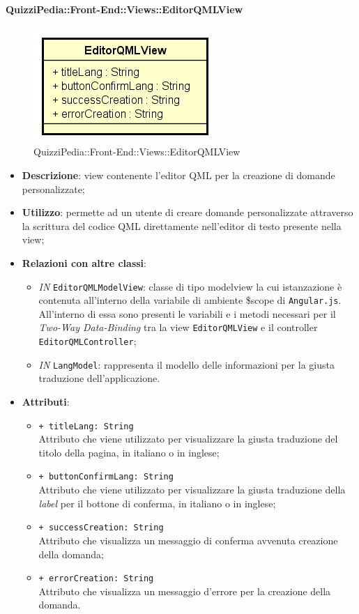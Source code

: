 \paragraph{QuizziPedia::Front-End::Views::EditorQMLView}
\begin{figure} [ht]
	\centering
	\includegraphics[scale=0.45]{UML/Classi/Front-End/QuizziPedia_Front-end_EditorQMLView.png}
	\caption{QuizziPedia::Front-End::Views::EditorQMLView}
\end{figure} \FloatBarrier
\begin{itemize}
	\item \textbf{Descrizione}: view contenente l'editor QML per la creazione di domande personalizzate;
	\item \textbf{Utilizzo}: permette ad un utente di creare domande personalizzate attraverso la scrittura del codice QML direttamente nell'editor di testo presente nella view;
	\item \textbf{Relazioni con altre classi}:
	\begin{itemize}
		\item \textit{IN} \texttt{EditorQMLModelView}: classe di tipo modelview la cui istanzazione è contenuta all'interno della variabile di ambiente \$scope di \texttt{Angular.js}. All'interno di essa sono presenti le variabili e i metodi necessari per il \textit{Two-Way Data-Binding} tra la view \texttt{EditorQMLView} e il controller \texttt{EditorQMLController};
		\item \textit{IN} \texttt{LangModel}: rappresenta il modello delle informazioni per la giusta traduzione dell'applicazione.
	\end{itemize}
	\item \textbf{Attributi}:
	\begin{itemize}
		\item \texttt{+ titleLang: String} \\ Attributo che viene utilizzato per visualizzare la giusta traduzione del titolo della pagina, in italiano o in inglese;
		\item \texttt{+ buttonConfirmLang: String} \\ Attributo che viene utilizzato per visualizzare la giusta traduzione della \textit{label} per il bottone di conferma, in italiano o in inglese;
		\item \texttt{+ successCreation: String} \\ Attributo che visualizza un messaggio di conferma avvenuta creazione della domanda;
		\item \texttt{+ errorCreation: String} \\ Attributo che visualizza un messaggio d'errore per la creazione della domanda.
	\end{itemize}
\end{itemize}

